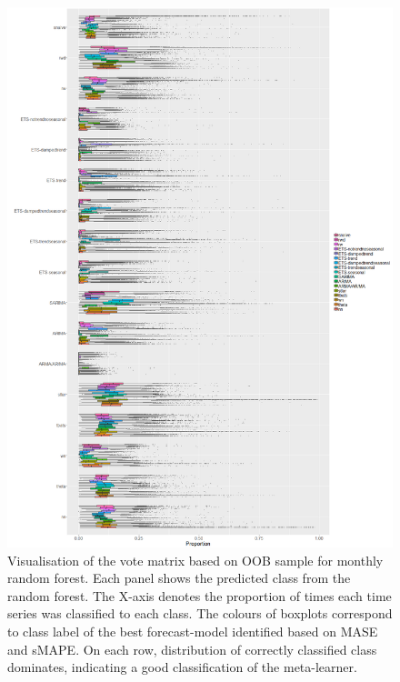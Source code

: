 \documentclass[11pt,a4paper,]{article}
\begin{document}
\begin{figure}
\centering
\includegraphics{figures/oobmonthly-1.png}
\caption{\label{fig:oobmonthly}Visualisation of the vote matrix based on OOB sample for monthly random forest. Each panel shows the predicted class from the random forest. The X-axis denotes the proportion of times each time series was classified to each class. The colours of boxplots correspond to class label of the best forecast-model identified based on MASE and sMAPE. On each row, distribution of correctly classified class dominates, indicating a good classification of the meta-learner.}
\end{figure}
\end{document}
